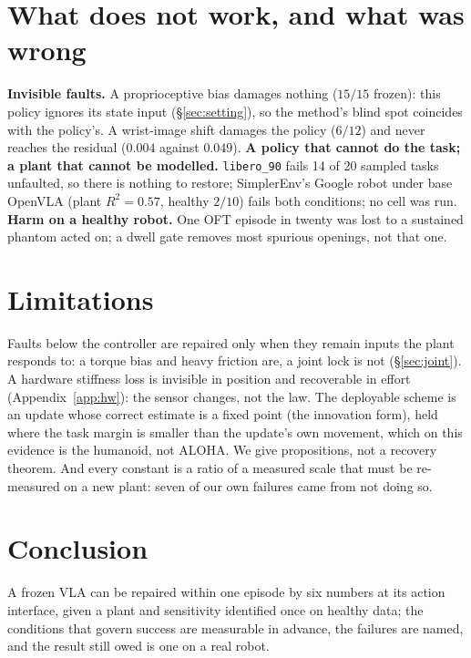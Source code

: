 \documentclass{article}
\newcommand{\code}[1]{\texttt{\small #1}}
\begin{document}
\section{What does not work, and what was wrong}
\label{sec:fail}

\textbf{Invisible faults.} A proprioceptive bias damages nothing ($15/15$ frozen): this policy
ignores its state input (\S\ref{sec:setting}), so the method's blind spot coincides with the
policy's. A wrist-image shift damages the policy ($6/12$) and never reaches the residual
($0.004$ against $0.049$). \textbf{A policy that cannot do the task; a plant that cannot be
modelled.} \code{libero\_90} fails 14 of 20 sampled tasks unfaulted, so there is nothing to
restore; SimplerEnv's Google robot under base OpenVLA (plant $R^2=0.57$, healthy $2/10$) fails both conditions; no cell was run. \textbf{Harm on a healthy robot.} One OFT episode in
twenty was lost to a sustained phantom acted on; a dwell gate removes most spurious openings,
not that one.

\section{Limitations}
\label{sec:limits}

Faults below the controller are repaired only when they remain inputs the plant responds to:
a torque bias and heavy friction are, a joint lock is not (\S\ref{sec:joint}). A hardware
stiffness loss is invisible in position and recoverable in effort (Appendix~\ref{app:hw}): the
sensor changes, not the law. The deployable scheme is an update whose correct estimate is a fixed point (the innovation
form), held where the task margin is smaller than the update's own movement, which on this
evidence is the humanoid, not ALOHA. We give propositions, not a recovery theorem. And every constant is a ratio
of a measured scale that must be re-measured on a new plant: seven of our own failures came
from not doing so.

\section{Conclusion}



A frozen VLA can be repaired within one episode by six numbers at its action interface, given a
plant and sensitivity identified once on healthy data; the conditions that govern success are
measurable in advance, the failures are named, and the result still owed is one on a real robot.
\end{document}

